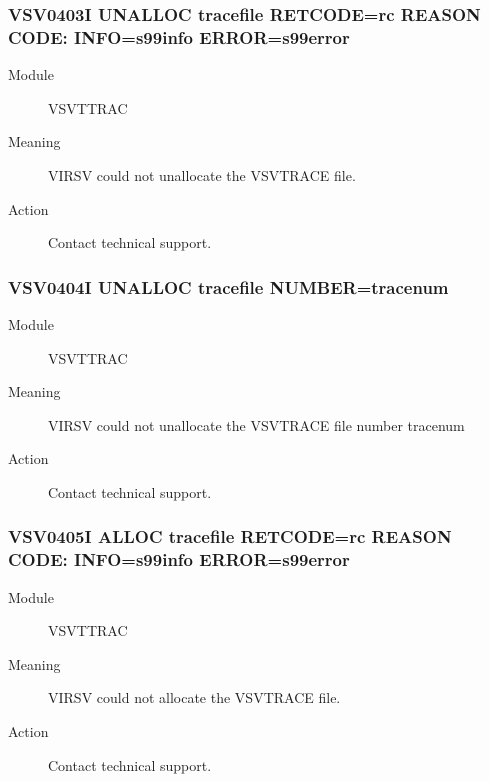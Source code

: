 \documentclass[letterpaper,10pt,english]{sphinxmanual}
\begin{document}
\subsubsection{VSV0403I UNALLOC tracefile RETCODE=rc REASON CODE: INFO=s99info ERROR=s99error}
\label{\detokenize{messages:vsv0403i-unalloc-tracefile-retcode-rc-reason-code-info-s99info-error-s99error}}\begin{description}
\item[{Module}] \leavevmode
VSVTTRAC

\item[{Meaning}] \leavevmode
VIRSV could not unallocate the VSVTRACE file.

\item[{Action}] \leavevmode
Contact technical support.

\end{description}


\subsubsection{VSV0404I UNALLOC tracefile NUMBER=tracenum}
\label{\detokenize{messages:vsv0404i-unalloc-tracefile-number-tracenum}}\begin{description}
\item[{Module}] \leavevmode
VSVTTRAC

\item[{Meaning}] \leavevmode
VIRSV could not unallocate the VSVTRACE file number tracenum

\item[{Action}] \leavevmode
Contact technical support.

\end{description}


\subsubsection{VSV0405I ALLOC tracefile RETCODE=rc REASON CODE: INFO=s99info ERROR=s99error}
\label{\detokenize{messages:vsv0405i-alloc-tracefile-retcode-rc-reason-code-info-s99info-error-s99error}}\begin{description}
\item[{Module}] \leavevmode
VSVTTRAC

\item[{Meaning}] \leavevmode
VIRSV could not allocate the VSVTRACE file.

\item[{Action}] \leavevmode
Contact technical support.

\end{description}
\end{document}
